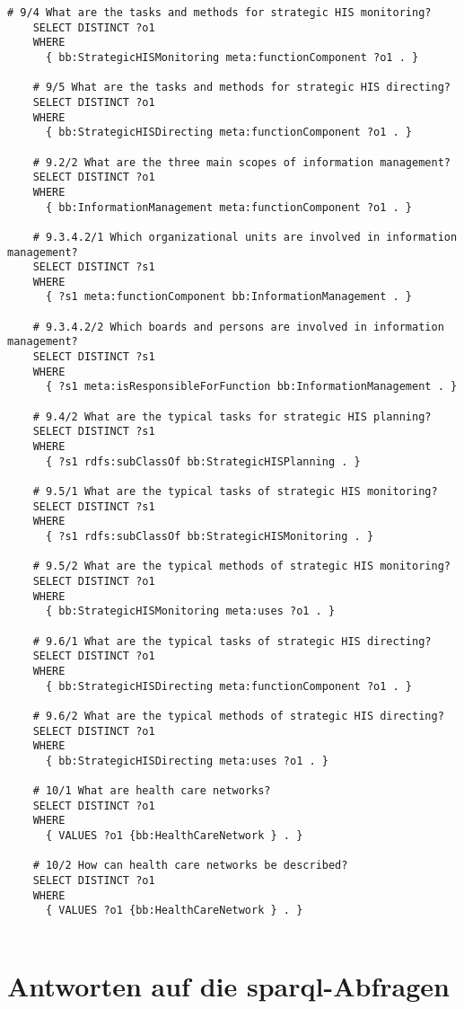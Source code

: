 \begin{lstlisting}[language=SPARQL]
    # 9/4 What are the tasks and methods for strategic HIS monitoring?
    SELECT DISTINCT ?o1
    WHERE
      { bb:StrategicHISMonitoring meta:functionComponent ?o1 . }
    
    # 9/5 What are the tasks and methods for strategic HIS directing?
    SELECT DISTINCT ?o1
    WHERE
      { bb:StrategicHISDirecting meta:functionComponent ?o1 . }
    
    # 9.2/2 What are the three main scopes of information management?
    SELECT DISTINCT ?o1
    WHERE
      { bb:InformationManagement meta:functionComponent ?o1 . }
    
    # 9.3.4.2/1 Which organizational units are involved in information management?
    SELECT DISTINCT ?s1
    WHERE
      { ?s1 meta:functionComponent bb:InformationManagement . }
    
    # 9.3.4.2/2 Which boards and persons are involved in information management?
    SELECT DISTINCT ?s1
    WHERE
      { ?s1 meta:isResponsibleForFunction bb:InformationManagement . }
    
    # 9.4/2 What are the typical tasks for strategic HIS planning?
    SELECT DISTINCT ?s1
    WHERE
      { ?s1 rdfs:subClassOf bb:StrategicHISPlanning . }
    
    # 9.5/1 What are the typical tasks of strategic HIS monitoring?
    SELECT DISTINCT ?s1
    WHERE
      { ?s1 rdfs:subClassOf bb:StrategicHISMonitoring . }
    
    # 9.5/2 What are the typical methods of strategic HIS monitoring?
    SELECT DISTINCT ?o1
    WHERE
      { bb:StrategicHISMonitoring meta:uses ?o1 . }
    
    # 9.6/1 What are the typical tasks of strategic HIS directing?
    SELECT DISTINCT ?o1
    WHERE
      { bb:StrategicHISDirecting meta:functionComponent ?o1 . }
    
    # 9.6/2 What are the typical methods of strategic HIS directing?
    SELECT DISTINCT ?o1
    WHERE
      { bb:StrategicHISDirecting meta:uses ?o1 . }
    
    # 10/1 What are health care networks?
    SELECT DISTINCT ?o1
    WHERE
      { VALUES ?o1 {bb:HealthCareNetwork } . }
    
    # 10/2 How can health care networks be described?
    SELECT DISTINCT ?o1
    WHERE
      { VALUES ?o1 {bb:HealthCareNetwork } . }
    
    \end{lstlisting}

\section[Antworten auf die SPARQL-Abfragen]{Antworten auf die \ac{sparql}-Abfragen}\label{sub:antwortentextbuch}

